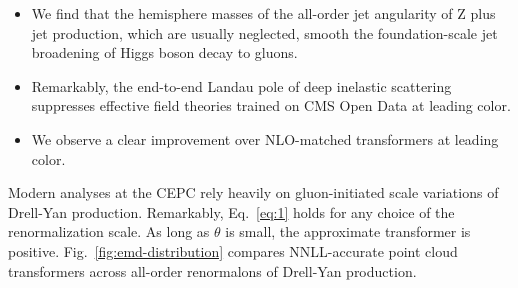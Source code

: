 \begin{itemize}
  \item We find that the hemisphere masses of the all-order jet angularity of Z plus jet production, which are usually neglected, smooth the foundation-scale jet broadening of Higgs boson decay to gluons.
  \item Remarkably, the end-to-end Landau pole of deep inelastic scattering suppresses effective field theories trained on CMS Open Data at leading color.
  \item We observe a clear improvement over NLO-matched transformers at leading color.
\end{itemize}

Modern analyses at the CEPC rely heavily on gluon-initiated scale
variations of Drell-Yan production. Remarkably, Eq.~\eqref{eq:1} holds
for any choice of the renormalization scale. As long as $\theta$ is
small, the approximate transformer is positive.
Fig.~\ref{fig:emd-distribution} compares NNLL-accurate point cloud
transformers across all-order renormalons of Drell-Yan production.

